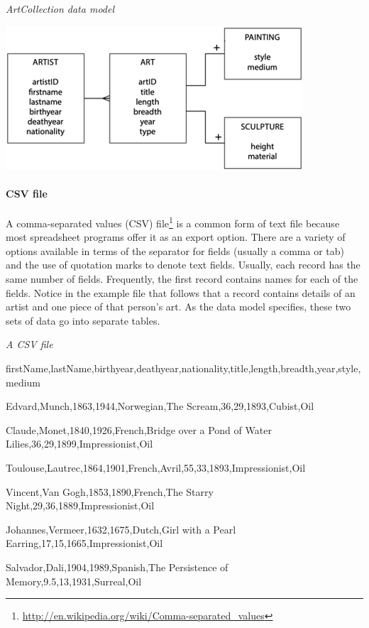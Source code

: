 \documentclass[
]{article}
\begin{document}
\emph{ArtCollection data model}

\includegraphics{Figures/Chapter 22/ArtCollection.png}

\hypertarget{csv-file}{%
\paragraph*{CSV file}\label{csv-file}}

A comma-separated values (CSV) file\footnote{\url{http://en.wikipedia.org/wiki/Comma-separated_values}} is a common form of text file
because most spreadsheet programs offer it as an export option. There
are a variety of options available in terms of the separator for fields
(usually a comma or tab) and the use of quotation marks to denote text
fields. Usually, each record has the same number of fields. Frequently,
the first record contains names for each of the fields. Notice in the
example file that follows that a record contains details of an artist
and one piece of that person's art. As the data model specifies, these
two sets of data go into separate tables.

\emph{A CSV file}

firstName,lastName,birthyear,deathyear,nationality,title,length,breadth,year,style,medium

Edvard,Munch,1863,1944,Norwegian,The Scream,36,29,1893,Cubist,Oil

Claude,Monet,1840,1926,French,Bridge over a Pond of Water
Lilies,36,29,1899,Impressionist,Oil

Toulouse,Lautrec,1864,1901,French,Avril,55,33,1893,Impressionist,Oil

Vincent,Van Gogh,1853,1890,French,The Starry
Night,29,36,1889,Impressionist,Oil

Johannes,Vermeer,1632,1675,Dutch,Girl with a Pearl
Earring,17,15,1665,Impressionist,Oil

Salvador,Dali,1904,1989,Spanish,The Persistence of
Memory,9.5,13,1931,Surreal,Oil
\end{document}
